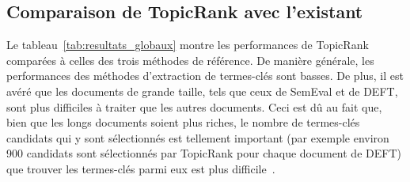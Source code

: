  \subsection{Comparaison de TopicRank avec l'existant}
  \label{subsec:comparaison_de_topicrank_avec_l_existant}
    Le tableau~\ref{tab:resultats_globaux} montre les performances de TopicRank
    comparées à celles des trois méthodes de référence. De manière générale, les
    performances des méthodes d'extraction de termes-clés sont basses. De
    plus, il est avéré que les documents de grande taille, tels que ceux de
    SemEval et de DEFT, sont plus difficiles à traiter que les autres documents.
    Ceci est dû au fait que, bien que les longs documents soient plus riches, le
    nombre de termes-clés candidats qui y sont sélectionnés est tellement
    important (par exemple environ 900 candidats sont sélectionnés par TopicRank pour
    chaque document de DEFT) que trouver les termes-clés parmi eux est plus
    difficile~\cite{hasan2014state_of_the_art}.

